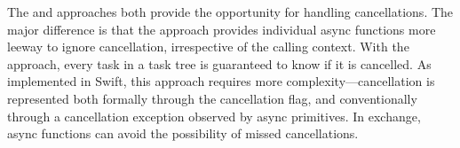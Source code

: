 The \bup and \simultaneous approaches both provide the opportunity for handling cancellations. The major difference is that the \bup approach provides individual async functions more leeway to ignore cancellation, irrespective of the calling context. With the \simultaneous approach, every task in a task tree is guaranteed to know if it is cancelled. As implemented in Swift, this approach requires more complexity---cancellation is represented both formally through the cancellation flag, and conventionally through a cancellation exception observed by async primitives. In exchange, async functions can avoid the possibility of missed cancellations.

